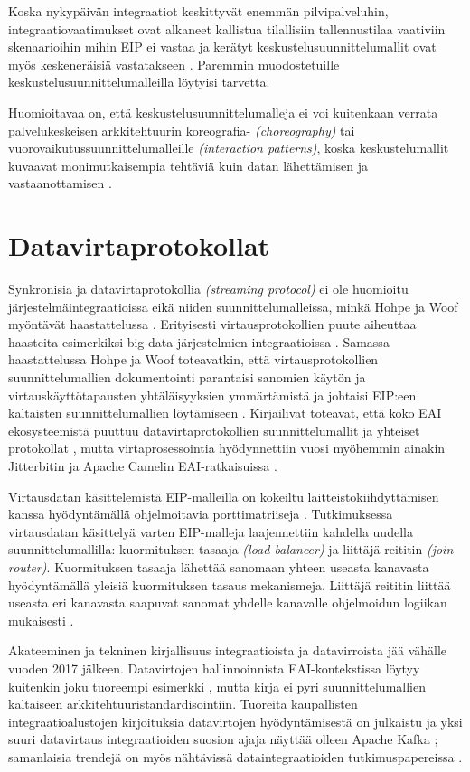 Koska nykypäivän integraatiot keskittyvät enemmän pilvipalveluhin, integraatiovaatimukset ovat alkaneet kallistua tilallisiin tallennustilaa vaativiin skenaarioihin mihin EIP ei vastaa ja kerätyt keskustelusuunnittelumallit ovat myös keskeneräisiä vastatakseen \citep{Ritter2017}. Paremmin muodostetuille keskustelusuunnittelumalleilla löytyisi tarvetta.

Huomioitavaa on, että keskustelusuunnittelumalleja ei voi kuitenkaan verrata palvelukeskeisen arkkitehtuurin koreografia- \textit{(choreography)} tai vuorovaikutussuunnittelumalleille \textit{(interaction patterns)}, koska 
keskustelumallit kuvaavat monimutkaisempia tehtäviä kuin datan lähettämisen ja vastaanottamisen \citep{Ritter2017}.

\section{Datavirtaprotokollat}
Synkronisia ja datavirtaprotokollia \textit{(streaming protocol)} ei ole huomioitu järjestelmäintegraatioissa eikä niiden suunnittelumalleissa, minkä Hohpe ja Woof myöntävät haastattelussa \citep{Zimmermann2016}. Erityisesti virtausprotokollien puute aiheuttaa haasteita esimerkiksi big data järjestelmien integraatioissa \citep{Ritter2017}.
Samassa haastattelussa Hohpe ja Woof toteavatkin, että virtausprotokollien suunnittelumallien dokumentointi parantaisi sanomien käytön ja virtauskäyttötapausten yhtäläisyyksien ymmärtämistä ja johtaisi EIP:een kaltaisten suunnittelumallien löytämiseen \citep{Ritter2017}.
Kirjailivat toteavat, että koko EAI ekosysteemistä puuttuu datavirtaprotokollien suunnittelumallit ja yhteiset protokollat \citep{Zimmermann2016}, mutta virtaprosessointia hyödynnettiin vuosi myöhemmin ainakin Jitterbitin ja Apache Camelin EAI-ratkaisuissa \citep{Ritter2017}.

Virtausdatan käsittelemistä EIP-malleilla on kokeiltu laitteistokiihdyttämisen kanssa hyödyntämällä ohjelmoitavia porttimatriiseja \citep{DannRitter2017}. Tutkimuksessa virtausdatan käsittelyä varten EIP-malleja laajennettiin kahdella uudella suunnittelumallilla: kuormituksen tasaaja \textit{(load balancer)} ja liittäjä reititin \textit{(join router)}. Kuormituksen tasaaja lähettää sanomaan yhteen useasta kanavasta hyödyntämällä yleisiä kuormituksen tasaus mekanismeja. Liittäjä reititin liittää useasta eri kanavasta saapuvat sanomat yhdelle kanavalle ohjelmoidun logiikan mukaisesti \citep{DannRitter2017}.


Akateeminen ja tekninen kirjallisuus integraatioista ja datavirroista jää vähälle vuoden 2017 jälkeen. Datavirtojen hallinnoinnista EAI-kontekstissa löytyy kuitenkin joku tuoreempi esimerkki \citep{WilkesPareek}, mutta kirja ei pyri suunnittelumallien kaltaiseen arkkitehtuuristandardisointiin. 
Tuoreita kaupallisten integraatioalustojen kirjoituksia datavirtojen hyödyntämisestä on julkaistu ja yksi suuri datavirtaus integraatioiden suosion ajaja näyttää olleen Apache Kafka \citep{WSO2Stream} \citep{IBMStream}; samanlaisia trendejä on myös nähtävissä dataintegraatioiden tutkimuspapereissa \citep{Bousdekis2021}.

